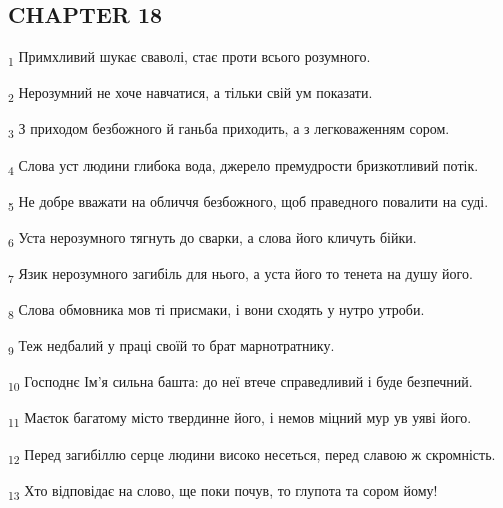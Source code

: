 \subsection{CHAPTER 18}
\begin{tcolorbox}
\textsubscript{1} Примхливий шукає сваволі, стає проти всього розумного.
\end{tcolorbox}
\begin{tcolorbox}
\textsubscript{2} Нерозумний не хоче навчатися, а тільки свій ум показати.
\end{tcolorbox}
\begin{tcolorbox}
\textsubscript{3} З приходом безбожного й ганьба приходить, а з легковаженням сором.
\end{tcolorbox}
\begin{tcolorbox}
\textsubscript{4} Слова уст людини глибока вода, джерело премудрости бризкотливий потік.
\end{tcolorbox}
\begin{tcolorbox}
\textsubscript{5} Не добре вважати на обличчя безбожного, щоб праведного повалити на суді.
\end{tcolorbox}
\begin{tcolorbox}
\textsubscript{6} Уста нерозумного тягнуть до сварки, а слова його кличуть бійки.
\end{tcolorbox}
\begin{tcolorbox}
\textsubscript{7} Язик нерозумного загибіль для нього, а уста його то тенета на душу його.
\end{tcolorbox}
\begin{tcolorbox}
\textsubscript{8} Слова обмовника мов ті присмаки, і вони сходять у нутро утроби.
\end{tcolorbox}
\begin{tcolorbox}
\textsubscript{9} Теж недбалий у праці своїй то брат марнотратнику.
\end{tcolorbox}
\begin{tcolorbox}
\textsubscript{10} Господнє Ім'я сильна башта: до неї втече справедливий і буде безпечний.
\end{tcolorbox}
\begin{tcolorbox}
\textsubscript{11} Маєток багатому місто твердинне його, і немов міцний мур ув уяві його.
\end{tcolorbox}
\begin{tcolorbox}
\textsubscript{12} Перед загибіллю серце людини високо несеться, перед славою ж скромність.
\end{tcolorbox}
\begin{tcolorbox}
\textsubscript{13} Хто відповідає на слово, ще поки почув, то глупота та сором йому!
\end{tcolorbox}
